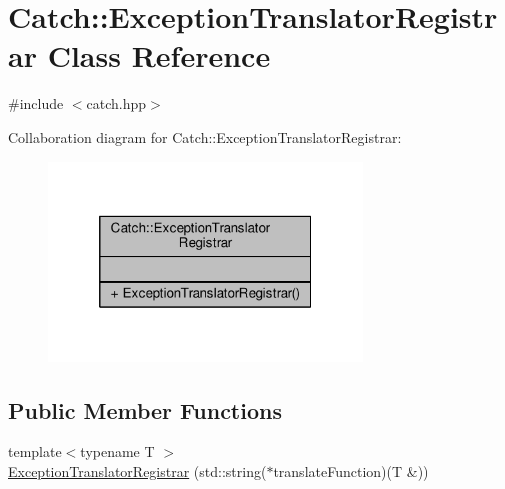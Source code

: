 \hypertarget{class_catch_1_1_exception_translator_registrar}{\section{Catch\-:\-:Exception\-Translator\-Registrar Class Reference}
\label{class_catch_1_1_exception_translator_registrar}
}


{\ttfamily \#include $<$catch.\-hpp$>$}



Collaboration diagram for Catch\-:\-:Exception\-Translator\-Registrar\-:
\nopagebreak
\begin{figure}[H]
\begin{center}
\leavevmode
\includegraphics[width=236pt]{class_catch_1_1_exception_translator_registrar__coll__graph}
\end{center}
\end{figure}
\subsection*{Public Member Functions}
\begin{DoxyCompactItemize}
\item 
{\footnotesize template$<$typename T $>$ }\\\hyperlink{class_catch_1_1_exception_translator_registrar_aa73229de911f26b1df6c6c87c4d9e04e}{Exception\-Translator\-Registrar} (std\-::string($\ast$translate\-Function)(T \&))
\end{DoxyCompactItemize}


